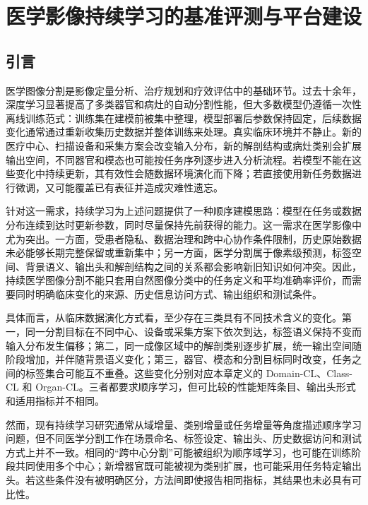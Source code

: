 
\chapter{医学影像持续学习的基准评测与平台建设}
\label{chap:benchmark}
\setlength{\emergencystretch}{1em}

\section{引言}
\label{sec:benchmark-introduction}

医学图像分割是影像定量分析、治疗规划和疗效评估中的基础环节。过去十余年，深度学习显著提高了多类器官和病灶的自动分割性能\cite{litjens2017survey}，但大多数模型仍遵循一次性离线训练范式：训练集在建模前被集中整理，模型部署后参数保持固定，后续数据变化通常通过重新收集历史数据并整体训练来处理。真实临床环境并不静止。新的医疗中心、扫描设备和采集方案会改变输入分布，新的解剖结构或病灶类别会扩展输出空间，不同器官和模态也可能按任务序列逐步进入分析流程。若模型不能在这些变化中持续更新，其有效性会随数据环境演化而下降；若直接使用新任务数据进行微调，又可能覆盖已有表征并造成灾难性遗忘\cite{lee2020clinicalcl,vokinger2021medicaldevices}。

针对这一需求，持续学习为上述问题提供了一种顺序建模思路：模型在任务或数据分布连续到达时更新参数，同时尽量保持先前获得的能力\cite{wang2024continualsurvey}。这一需求在医学影像中尤为突出。一方面，受患者隐私、数据治理和跨中心协作条件限制，历史原始数据未必能够长期完整保留或重新集中；另一方面，医学分割属于像素级预测，标签空间、背景语义、输出头和解剖结构之间的关系都会影响新旧知识如何冲突。因此，持续医学图像分割不能只套用自然图像分类中的任务定义和平均准确率评价，而需要同时明确临床变化的来源、历史信息访问方式、输出组织和测试条件。

具体而言，从临床数据演化方式看，至少存在三类具有不同技术含义的变化。第一，同一分割目标在不同中心、设备或采集方案下依次到达，标签语义保持不变而输入分布发生偏移；第二，同一成像区域中的解剖类别逐步扩展，统一输出空间随阶段增加，并伴随背景语义变化；第三，器官、模态和分割目标同时改变，任务之间的标签集合可能互不重叠。这些变化分别对应本章定义的 Domain-CL、Class-CL 和 Organ-CL。三者都要求顺序学习，但可比较的性能矩阵条目、输出头形式和适用指标并不相同。

然而，现有持续学习研究通常从域增量、类别增量或任务增量等角度描述顺序学习问题，但不同医学分割工作在场景命名、标签设定、输出头、历史数据访问和测试方式上并不一致\cite{wang2024continualsurvey,kumari2025medicalcl,yuan2024continualseg,gonzalez2023lifelong,whatwrong}。相同的“跨中心分割”可能被组织为顺序域学习，也可能在训练阶段共同使用多个中心；新增器官既可能被视为类别扩展，也可能采用任务特定输出头。若这些条件没有被明确区分，方法间即使报告相同指标，其结果也未必具有可比性。

